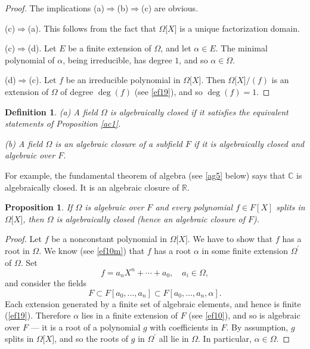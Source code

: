 \documentclass[a4paper,11pt,final,openany]{memoir}
\newtheorem{proposition}[X]{Proposition}
\newtheorem{definition}[X]{Definition}
\theoremstyle{nonumberplain}
\newtheorem{proof}{Proof.}
\begin{document}
\begin{proof}
The implications (a)$\Rightarrow$(b)$\Rightarrow$(c) are obvious.

\noindent(c)$\Rightarrow$(a). This follows from the fact that $\Omega\lbrack
X]$ is a unique factorization domain.

\noindent(c)$\Rightarrow$(d). Let $E$ be a finite extension of $\Omega$, and
let $\alpha\in E$. The minimal polynomial of $\alpha$, being irreducible, has
degree $1$, and so $\alpha\in\Omega$.

\noindent(d)$\Rightarrow$(c). Let $f$ be an irreducible polynomial in
$\Omega\lbrack X]$. Then $\Omega\lbrack X]/(f)$ is an extension of $\Omega$ of
degree $\deg(f)$ (see \ref{ef19}), and so $\deg(f)=1$.
\end{proof}

\begin{definition}
\label{ac2}(a) A field $\Omega$ is
%
\emph{algebraically closed }if it satisfies the equivalent statements of
Proposition \ref{ac1}.

(b) A field $\Omega$ is an
%
\emph{algebraic closure }of a subfield $F$ if it is algebraically closed and
algebraic over $F$.
\end{definition}

For example, the fundamental theorem of algebra%
(see \ref{ag5} below) says that $\mathbb{C}{}$ is algebraically closed. It is
an algebraic closure of $\mathbb{R}{}$.

\begin{proposition}
\label{sf10}If $\Omega$ is algebraic over $F$ and every polynomial $f\in F[X]$
splits in $\Omega\lbrack X]$, then $\Omega$ is algebraically closed (hence an
algebraic closure of $F$).
\end{proposition}

\begin{proof}
Let $f$ be a nonconstant polynomial in $\Omega\lbrack X]$. We have to show
that $f$ has a root in $\Omega$. We know (see \ref{ef10m}) that $f$ has a root
$\alpha$ in some finite extension $\Omega^{\prime}$ of $\Omega$. Set
\[
f=a_{n}X^{n}+\cdots+a_{0},\quad a_{i}\in\Omega,
\]
and consider the fields
\[
F\subset F[a_{0},\ldots,a_{n}]\subset F[a_{0},\ldots,a_{n},\alpha].
\]
Each extension generated by a finite set of algebraic elements, and hence is
finite (\ref{ef19}). Therefore $\alpha$ lies in a finite extension of $F$ (see
\ref{ef10}), and so is algebraic over $F$ --- it is a root of a polynomial $g$
with coefficients in $F$. By assumption, $g$ splits in $\Omega\lbrack X]$, and
so the roots of $g$ in $\Omega^{\prime}$ all lie in $\Omega$. In particular,
$\alpha\in\Omega.$
\end{proof}
\end{document}
